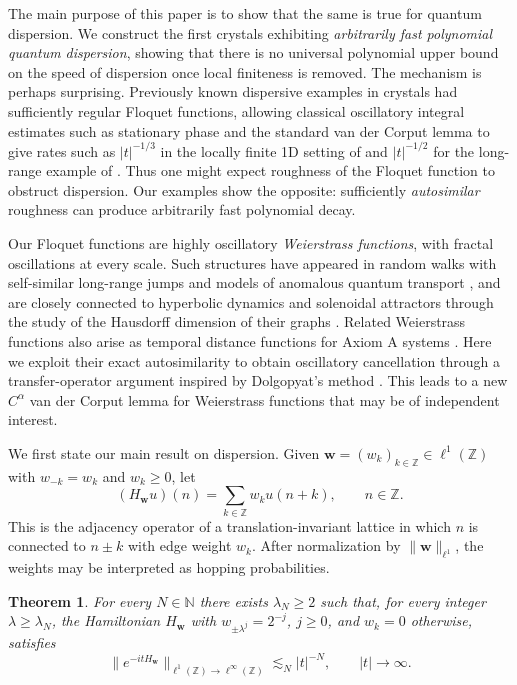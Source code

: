 \documentclass[11pt]{amsart}
\theoremstyle{plain}
\newtheorem{theorem}{Theorem}[section]
\theoremstyle{definition}
\numberwithin{equation}{section}
\begin{document}
The main purpose of this paper is to show that the same is true for quantum dispersion. We construct the first crystals exhibiting \emph{arbitrarily fast polynomial quantum dispersion}, showing that there is no universal polynomial upper bound on the speed of dispersion once local finiteness is removed. The mechanism is perhaps surprising. Previously known dispersive examples in crystals had sufficiently regular Floquet functions, allowing classical oscillatory integral estimates such as stationary phase and the standard van der Corput lemma to give rates such as $|t|^{-1/3}$ in the locally finite 1D setting of \cite{DamanikFillmanYoung} and $|t|^{-1/2}$ for the long-range example of \cite{KernerPostSabriTaufer}. Thus one might expect roughness of the Floquet function to obstruct dispersion. Our examples show the opposite: sufficiently \textit{autosimilar} roughness can produce arbitrarily fast polynomial decay.

Our Floquet functions are highly oscillatory \textit{Weierstrass functions}, with fractal oscillations at every scale. Such structures have appeared in random walks with self-similar long-range jumps and models of anomalous quantum transport \cite{HughesShlesingerMontroll,CaceresNizama}, and are closely connected to hyperbolic dynamics and solenoidal attractors through the study of the Hausdorff dimension of their graphs \cite{BaranskiBaranyRomanowska,Hunt,Ledrappier,Keller,Shen,Tsujii,Romanowska}. Related Weierstrass functions also arise as temporal distance functions for Axiom A systems \cite{TZ23,Leclerc2}. Here we exploit their exact autosimilarity to obtain oscillatory cancellation through a transfer-operator argument inspired by Dolgopyat's method \cite{Do98,Na05}. This leads to a new $C^\alpha$ van der Corput lemma for Weierstrass functions that may be of independent interest.

We first state our main result on dispersion. Given $\mathbf w=(w_k)_{k\in\mathbb Z}\in\ell^1(\mathbb Z)$ with $w_{-k}=w_k$ and $w_k\ge 0$, let
$$
(H_{\mathbf w}u)(n)=\sum_{k\in\mathbb Z}w_k u(n+k),\qquad n\in\mathbb Z.
$$
This is the adjacency operator of a translation-invariant lattice in which $n$ is connected to $n\pm k$ with edge weight $w_k$. After normalization by $\|\mathbf w\|_{\ell^1}$, the weights may be interpreted as hopping probabilities.

\begin{theorem}\label{thm:maincrystal}
For every $N\in\mathbb N$ there exists $\lambda_N\geq2$ such that, for every integer $\lambda\geq\lambda_N$, the Hamiltonian $H_{\mathbf w}$ with $w_{\pm\lambda^j}=2^{-j}$, $j\geq0$, and $w_k=0$ otherwise, satisfies
$$
\|e^{-itH_{\mathbf w}}\|_{\ell^1(\mathbb Z)\to\ell^\infty(\mathbb Z)}
\lesssim_N |t|^{-N},\qquad |t|\to\infty.
$$
\end{theorem}
\end{document}
